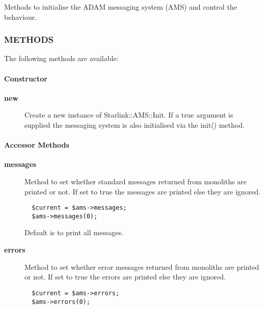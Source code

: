 \begin{description}
Methods to initialise the ADAM messaging system (AMS) and control the
behaviour.

\subsubsection*{METHODS\label{ORAC::Msg::Control::AMS_METHODS}}


The following methods are available:

\paragraph*{Constructor\label{ORAC::Msg::Control::AMS_Constructor}}
\begin{description}

\item[{\textbf{new}}] \mbox{}

Create a new instance of Starlink::AMS::Init.
If a true argument is supplied the messaging system is also
initialised via the init() method.

\end{description}
\paragraph*{Accessor Methods\label{ORAC::Msg::Control::AMS_Accessor_Methods}}
\begin{description}

\item[{\textbf{messages}}] \mbox{}

Method to set whether standard messages returned from monoliths
are printed or not. If set to true the messages are printed
else they are ignored.

\begin{verbatim}
  $current = $ams->messages;
  $ams->messages(0);
\end{verbatim}


Default is to print all messages.


\item[{\textbf{errors}}] \mbox{}

Method to set whether error messages returned from monoliths
are printed or not. If set to true the errors are printed
else they are ignored.

\begin{verbatim}
  $current = $ams->errors;
  $ams->errors(0);
\end{verbatim}



\end{description}
\end{description}
